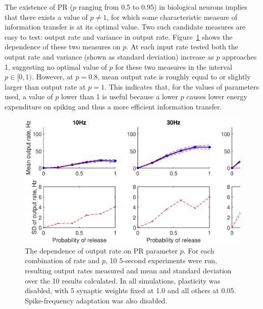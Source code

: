 \documentclass[a4paper,12pt]{report}
\theoremstyle{definition}
\begin{document}


The existence of PR ($p$ ranging from 0.5 to 0.95) in biological neurons implies that there exists a value of $p \neq 1$, for which some characteristic measure of information transfer is at its optimal value. Two such candidate measures are easy to test: output rate and variance in output rate. Figure~\ref{fig:exp7grid} shows the dependence of these two measures on $p$. At each input rate tested both the output rate and variance (shown as standard deviation) increase as $p$ approaches 1, suggesting no optimal value of $p$ for these two measures in the interval $p \in [0,1)$. However, at $p=0.8$, mean output rate is roughly equal to or slightly larger than output rate at $p=1$. This indicates that, for the values of parameters used, a value of $p$ lower than 1 is useful because a lower $p$ causes lower energy expenditure on spiking and thus a more efficient information transfer.

\begin{figure}[!htb]
    \includegraphics[width=\textwidth]{figures/exp7_PRoutputvariance_grid.eps}
    \caption{The dependence of output rate on PR parameter $p$. For each combination of rate and $p$, 10 5-second experiments were run, resulting output rates measured and mean and standard deviation over the 10 results calculated. In all simulations, plasticity was disabled, with 5 synaptic weights fixed at 1.0 and all others at 0.05. Spike-frequency adaptation was also disabled.}
    \label{fig:exp7grid}
\end{figure}
\end{document}

